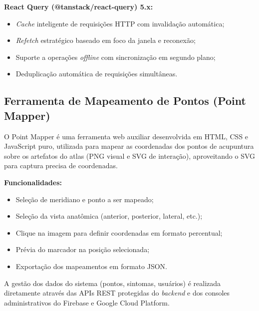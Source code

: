 \textbf{React Query (@tanstack/react-query) 5.x:}
\begin{itemize}
    \item \textit{Cache} inteligente de requisições HTTP com invalidação automática;
    \item \textit{Refetch} estratégico baseado em foco da janela e reconexão;
    \item Suporte a operações \textit{offline} com sincronização em segundo plano;
    \item Deduplicação automática de requisições simultâneas.
\end{itemize}

\subsection{Ferramenta de Mapeamento de Pontos (Point Mapper)}

O Point Mapper é uma ferramenta web auxiliar desenvolvida em HTML, CSS e JavaScript puro, utilizada para mapear as coordenadas dos pontos de acupuntura sobre os artefatos do atlas (PNG visual e SVG de interação), aproveitando o SVG para captura precisa de coordenadas.

\textbf{Funcionalidades:}
\begin{itemize}
    \item Seleção de meridiano e ponto a ser mapeado;
    \item Seleção da vista anatômica (anterior, posterior, lateral, etc.);
    \item Clique na imagem para definir coordenadas em formato percentual;
    \item Prévia do marcador na posição selecionada;
    \item Exportação dos mapeamentos em formato JSON.
\end{itemize}

A gestão dos dados do sistema (pontos, sintomas, usuários) é realizada diretamente através das APIs REST protegidas do \textit{backend} e dos consoles administrativos do Firebase e Google Cloud Platform.
